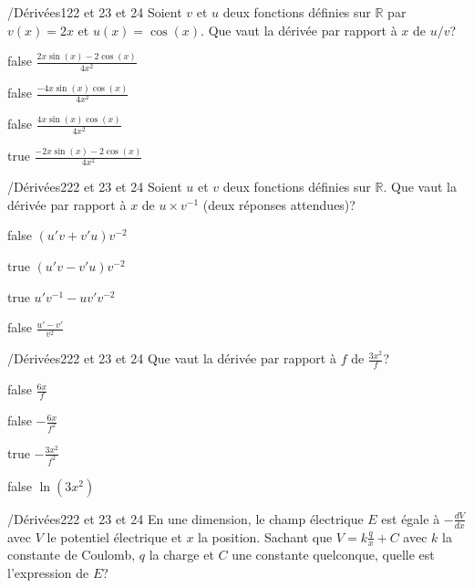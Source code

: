         	\begin{question}{/}{Dérivées}{1}{22 et 23 et 24}
				Soient $v$ et $u$ deux fonctions définies sur $\mathbb{R}$ par $v(x)=2x$ et $u(x)=\cos(x)$. Que vaut la dérivée par rapport à $x$ de $u/v$?
            \end{question}
            \begin{reponses}
            	\item[false] $\frac{2x\sin(x)-2\cos(x)}{4x^2}$
            	\item[false] $\frac{-4x\sin(x)\cos(x)}{4x^2}$
                \item[false] $\frac{4x\sin(x)\cos(x)}{4x^2}$
                \item[true] $\frac{-2x\sin(x)-2\cos(x)}{4x^2}$
            \end{reponses}
            \begin{question}{/}{Dérivées}{2}{22 et 23 et 24}
                Soient $u$ et $v$ deux fonctions définies sur $\mathbb{R}$. Que vaut la dérivée par rapport à $x$ de $u\times v^{-1}$ (deux réponses attendues)?
            \end{question}
            \begin{reponses}
            	\item[false] $(u'v+v'u)v^{-2}$
            	\item[true] $(u'v-v'u)v^{-2}$
                \item[true] $u'v^{-1}-uv'v^{-2}$
                \item[false] $\frac{u'-v'}{v^2}$
            \end{reponses}
            \begin{question}{/}{Dérivées}{2}{22 et 23 et 24}
                Que vaut la dérivée par rapport à $f$ de $\frac{3x^2}{f}$?
            \end{question}
            \begin{reponses}
                \item[false] $\frac{6x}{f}$
                \item[false] $-\frac{6x}{f^2}$
                \item[true] $-\frac{3x^2}{f^2}$
                \item[false] $\ln(3x^2)$
            \end{reponses}
            \begin{question}{/}{Dérivées}{2}{22 et 23 et 24}
                En une dimension, le champ électrique $E$ est égale à $-\frac{dV}{dx}$ avec $V$ le potentiel électrique et $x$ la position. Sachant que $V=k\frac{q}{x}+C$ avec $k$ la constante de Coulomb, $q$ la charge et $C$ une constante quelconque, quelle est l'expression de $E$?
            \end{question}
